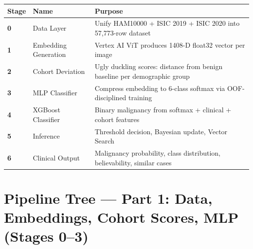 \documentclass[12pt, a4paper]{article}
\begin{document}
\begin{tabular}{@{} >{\bfseries}p{1.2cm} p{4.5cm} p{8cm} @{}}
\toprule
Stage & Name & Purpose \\
\midrule
0 & Data Layer         & Unify HAM10000 + ISIC 2019 + ISIC 2020 into 57{,}773-row dataset \\
1 & Embedding Generation & Vertex AI ViT produces 1408-D float32 vector per image \\
2 & Cohort Deviation   & Ugly duckling scores: distance from benign baseline per demographic group \\
3 & MLP Classifier     & Compress embedding to 6-class softmax via OOF-disciplined training \\
4 & XGBoost Classifier & Binary malignancy from softmax + clinical + cohort features \\
5 & Inference          & Threshold decision, Bayesian update, Vector Search \\
6 & Clinical Output    & Malignancy probability, class distribution, believability, similar cases \\
\bottomrule
\end{tabular}

\clearpage

\section{Pipeline Tree — Part 1: Data, Embeddings, Cohort Scores, MLP (Stages 0--3)}
\end{document}

